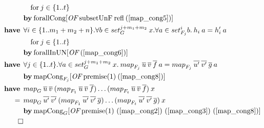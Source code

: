 \begin{align}
 & \quad \text{for} \: j \in \{1..t\} \nonumber \\*
 & \by \OF{\text{forallCong}}{\text{subsetUnF} \: \text{refl} \: (\ref{map_cong5})} \nonumber \\
%
\have & \forall i \in \{1..m_1+m_2+n\}. \forall b \in set_G^{j+m_1+m_2} \: x. \forall a \in set_{F_j}^i b. \: h_i \: a = h'_i \: a \label{map_cong7} \\*
 & \quad \text{for} \: j \in \{1..t\} \nonumber \\*
 & \by \OF{\text{forallInUN}}{(\ref{map_cong6})} \nonumber \\
%
\have & \forall j \in \{1..t\}. \forall a \in set_G^{j+m_1+m_2} \: x. \: \map{F_j}{u}{v}{f} \: a = \map{F_j}{u'}{v'}{g} \: a \label{map_cong8} \\*
 & \by \OF{\text{mapCong}_{F_j}}{\text{premise(1)} \: (\ref{map_cong8})} \nonumber \\
%
\have & \map{G}{u}{v}{}(\map{F_1}{u}{v}{f})\dots(\map{F_t}{u}{v}{f}) \: x \nonumber \\*
= \:\: & \map{G}{u'}{v'}{}(\map{F_1}{u'}{v'}{g})\dots(\map{F_t}{u'}{v'}{g}) \: x \\*
 & \by \OF{\text{mapCong}_G}{\text{premise(1) (\ref{map_cong2}) (\ref{map_cong3}) (\ref{map_cong8})}} \nonumber \\*
\qed \nonumber
\end{align}

